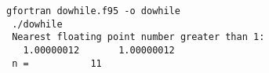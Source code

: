 \begin{Verbatim}[frame=lines,label=dowhile - commands and output]
 gfortran dowhile.f95 -o dowhile
 ./dowhile
 Nearest floating point number greater than 1: 
   1.00000012       1.00000012    
 n =           11
\end{Verbatim}
